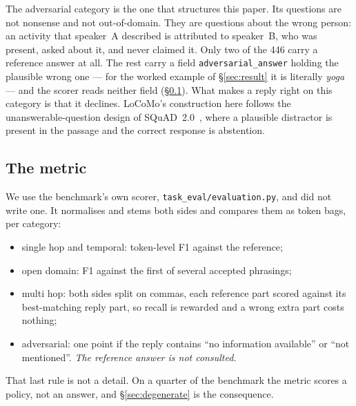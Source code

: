 \documentclass[11pt]{article}
\begin{document}
The adversarial category is the one that structures this paper. Its questions
are not nonsense and not out-of-domain. They are questions about the wrong
person: an activity that speaker~A described is attributed to speaker~B, who
was present, asked about it, and never claimed it. Only two of the 446 carry a
reference answer at all. The rest carry a field \texttt{adversarial\_answer}
holding the plausible wrong one --- for the worked example of
\S\ref{sec:result} it is literally \emph{yoga} --- and the scorer reads neither
field (\S\ref{sec:metric}). What makes a reply right on this category is that it
declines. LoCoMo's construction here follows the
unanswerable-question design of SQuAD~2.0~\cite{squad2}, where a plausible
distractor is present in the passage and the correct response is abstention.

\subsection{The metric}
\label{sec:metric}

We use the benchmark's own scorer, \texttt{task\_eval/evaluation.py}, and did
not write one. It normalises and stems both sides and compares them as token
bags, per category:

\begin{itemize}[leftmargin=1.2em,itemsep=1pt]
\item single hop and temporal: token-level F1 against the reference;
\item open domain: F1 against the first of several accepted phrasings;
\item multi hop: both sides split on commas, each reference part scored against
      its best-matching reply part, so recall is rewarded and a wrong extra
      part costs nothing;
\item adversarial: one point if the reply contains ``no information available''
      or ``not mentioned''. \emph{The reference answer is not consulted.}
\end{itemize}

That last rule is not a detail. On a quarter of the benchmark the metric scores
a policy, not an answer, and \S\ref{sec:degenerate} is the consequence.
\end{document}
